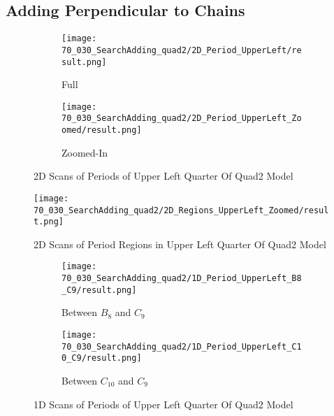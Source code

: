 \subsection{Adding Perpendicular to Chains}

\begin{figure}
    \centering
    \begin{subfigure}{0.4\textwidth}
        \centering
        \texttt{[image: 70\_030\_SearchAdding\_quad2/2D\_Period\_UpperLeft/result.png]}
        \caption{Full}
    \end{subfigure}
    \begin{subfigure}{0.4\textwidth}
        \centering
        \texttt{[image: 70\_030\_SearchAdding\_quad2/2D\_Period\_UpperLeft\_Zoomed/result.png]}
        \caption{Zoomed-In}
    \end{subfigure}
    \caption{2D Scans of Periods of Upper Left Quarter Of Quad2 Model}
\end{figure}

\begin{figure}
    \centering
    \texttt{[image: 70\_030\_SearchAdding\_quad2/2D\_Regions\_UpperLeft\_Zoomed/result.png]}
    \caption{2D Scans of Period Regions in Upper Left Quarter Of Quad2 Model}
\end{figure}

\begin{figure}
    \centering
    \begin{subfigure}{0.4\textwidth}
        \centering
        \texttt{[image: 70\_030\_SearchAdding\_quad2/1D\_Period\_UpperLeft\_B8\_C9/result.png]}
        \caption{Between $B_8$ and $C_9$}
    \end{subfigure}
    \begin{subfigure}{0.4\textwidth}
        \centering
        \texttt{[image: 70\_030\_SearchAdding\_quad2/1D\_Period\_UpperLeft\_C10\_C9/result.png]}
        \caption{Between $C_{10}$ and $C_9$}
    \end{subfigure}
    \caption{1D Scans of Periods of Upper Left Quarter Of Quad2 Model}
\end{figure}

